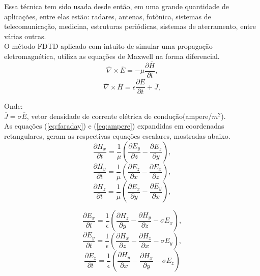 Essa técnica tem sido usada desde então, em uma grande quantidade de aplicações, entre elas estão: radares, antenas, fotônica, sistemas de telecomunicação, medicina, estruturas periódicas, sistemas de aterramento, entre várias outras.\\

O método FDTD aplicado com intuito de simular uma propagação eletromagnética, utiliza as equações de Maxwell na forma diferencial.
		\begin{equation}\label{eq:faraday}
			\overline{\nabla}\times\overline{E}=-\mu\frac{\partial \overline{H}}{\partial t},
		\end{equation}
		\begin{equation}\label{eq:ampere}
			\overline{\nabla}\times\overline{H}=\epsilon\frac{\partial \overline{E}}{\partial t} + \overline{J},
		\end{equation}
		
		Onde:\\
			$\overline{J} = \sigma\overline{E}$, vetor densidade de corrente elétrica  de condução(ampere/$m^{2}$).\\ 
				
			 As equações (\ref{eq:faraday}) e (\ref{eq:ampere}) expandidas em coordenadas retangulares, geram as respectivas equações escalares, mostradas abaixo.
		\begin{equation}
			\frac{\partial H_x}{\partial t} = \frac{1}{\mu}(\frac{\partial E_y}{\partial z}-\frac{\partial E_z}{\partial y}),
		\end{equation}
		\begin{equation}
			\frac{\partial H_y}{\partial t} = \frac{1}{\mu}(\frac{\partial E_z}{\partial x}-\frac{\partial E_x}{\partial z}),
		\end{equation}
		\begin{equation}
			\frac{\partial H_z}{\partial t} = \frac{1}{\mu}(\frac{\partial E_x}{\partial y}-\frac{\partial E_y}{\partial x}),
		\end{equation}

		\begin{equation}
			\frac{\partial E_x}{\partial t} = \frac{1}{\epsilon}(\frac{\partial H_z}{\partial y}-\frac{\partial H_y}{\partial z} -\sigma E_x),
		\end{equation}
		\begin{equation}
			\frac{\partial E_y}{\partial t} = \frac{1}{\epsilon}(\frac{\partial H_x}{\partial z}-\frac{\partial H_z}{\partial x} -\sigma E_y),
		\end{equation}
		\begin{equation}
			\frac{\partial E_z}{\partial t} = \frac{1}{\epsilon}(\frac{\partial H_y}{\partial x}-\frac{\partial H_x}{\partial y} -\sigma E_z)
		\end{equation}
	

